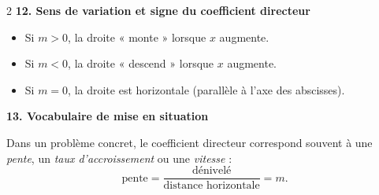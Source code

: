\documentclass[11pt,a4paper]{article}
\begin{document}
\begin{multicols}{2}
\medskip
\noindent\textbf{12. Sens de variation et signe du coefficient directeur}

\begin{itemize}[leftmargin=12pt]
\item Si $m > 0$, la droite « monte » lorsque $x$ augmente.
\item Si $m < 0$, la droite « descend » lorsque $x$ augmente.
\item Si $m = 0$, la droite est horizontale (parallèle à l'axe des abscisses).
\end{itemize}

\medskip
\noindent\textbf{13. Vocabulaire de mise en situation}

Dans un problème concret, le coefficient directeur correspond souvent à une
\emph{pente}, un \emph{taux d'accroissement} ou une \emph{vitesse} :
\[
\text{pente} = \frac{\text{dénivelé}}{\text{distance horizontale}} = m.
\]

\end{multicols}
\end{document}
